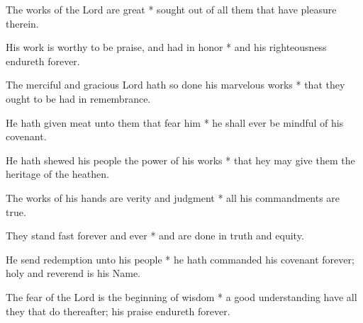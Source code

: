 \begin{multicols}{2}
	The works of the Lord are great * sought out of all them that have pleasure therein.
	
	His work is worthy to be praise, and had in honor * and his righteousness endureth forever.
	
	The merciful and gracious Lord hath so done his marvelous works * that they ought to be had in remembrance.
	
	He hath given meat unto them that fear him * he shall ever be mindful of his covenant.
	
	He hath shewed his people the power of his works * that hey may give them the heritage of the heathen.
	
	The works of his hands are verity and judgment * all his commandments are true.
	
	They stand fast forever and ever * and are done in truth and equity.
	
	He send redemption unto his people * he hath commanded his covenant forever; holy and reverend is his Name.
	
	The fear of the Lord is the beginning of wisdom * a good understanding have all they that do thereafter; his praise endureth forever.
\end{multicols}